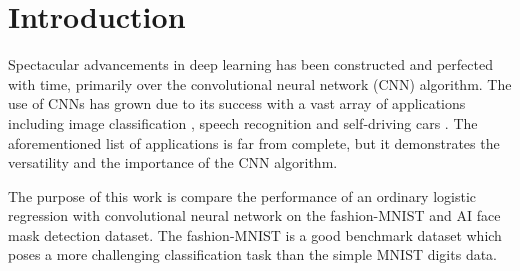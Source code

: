 \documentclass[../main.tex]{subfiles}
\begin{document}
\section{Introduction}
Spectacular advancements in deep learning has been constructed and perfected with time, primarily over the convolutional neural network (CNN) algorithm. The use of CNNs has grown due to its success with a vast array of applications including image classification \cite{He_2016_CVPR}, speech recognition \cite{AbdelHamid2013ExploringCN} and self-driving cars \cite{Wu_2017_CVPR_Workshops}. The aforementioned list of applications is far from complete, but it demonstrates the versatility and the importance of the CNN algorithm. 

The purpose of this work is compare the performance of an ordinary logistic regression with convolutional neural network on the fashion-MNIST and AI face mask detection dataset. The fashion-MNIST is a good benchmark dataset which poses a more challenging classification task than the simple MNIST digits data. 
\end{document}

